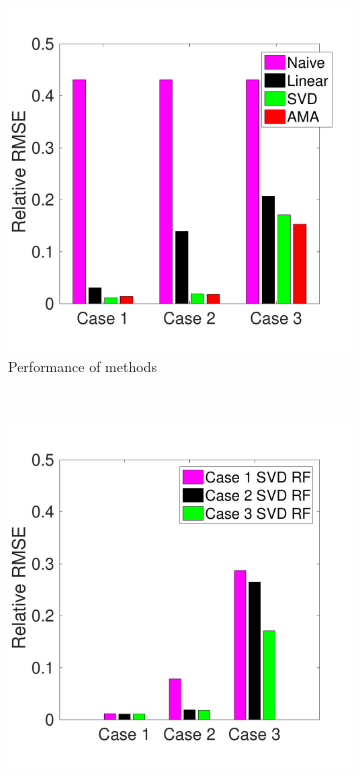 \documentclass{jov}
\begin{document}
\begin{figure}
\centering
\begin{subfigure}[b]{0.3 \textwidth}
	\includegraphics[width=\textwidth]{Figure10/summaryBarGraph.pdf}
	\caption{Performance of methods}
	\label{fig:summaryBarGraph}
    \end{subfigure}
    ~ %
    \begin{subfigure}[b]{0.3 \textwidth}   
	\includegraphics[width=\textwidth]{Figure10/SVDSummaryBarGraph.pdf}

\end{subfigure}
\end{figure}
\end{document}
